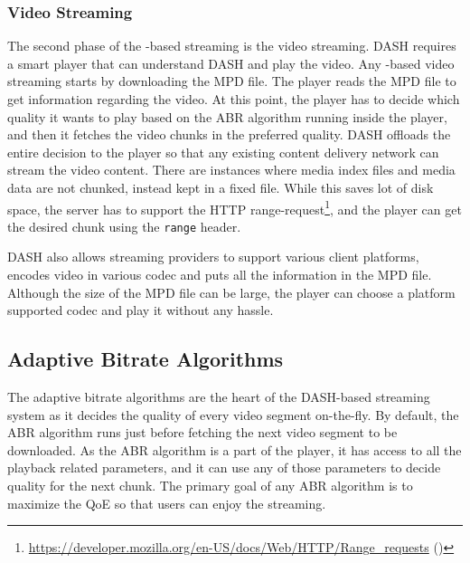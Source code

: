 \subsubsection{Video Streaming}
The second phase of the -based streaming is the video streaming. \ac{DASH} requires a smart player that can understand \ac{DASH} and play the video. Any -based video streaming starts by downloading the \ac{MPD} file. The player reads the \ac{MPD} file to get information regarding the video.  At this point, the player has to decide which quality it wants to play based on the \ac{ABR} algorithm running inside the player, and then it fetches the video chunks in the preferred quality. \ac{DASH} offloads the entire decision to the player so that any existing content delivery network can stream the video content. There are instances where media index files and media data are not chunked, instead kept in a fixed file. While this saves lot of disk space, the server has to support the HTTP range-request\footnote{\url{https://developer.mozilla.org/en-US/docs/Web/HTTP/Range_requests} (\lastaccessedtoday)}, and the player can get the desired chunk using the {\tt range} header.

\ac{DASH} also allows streaming providers to support various client platforms, encodes video in various codec and puts all the information in the \ac{MPD} file. Although the size of the \ac{MPD} file can be large, the player can choose a platform supported codec and play it without any hassle.


\subsection{Adaptive Bitrate Algorithms}
The adaptive bitrate algorithms are the heart of the DASH-based streaming system as it decides the quality of every video segment on-the-fly. By default, the \ac{ABR} algorithm runs just before fetching the next video segment to be downloaded. As the \ac{ABR} algorithm is a part of the player, it has access to all the playback related parameters, and it can use any of those parameters to decide quality for the next chunk. The primary goal of any \ac{ABR} algorithm is to maximize the \ac{QoE} so that users can enjoy the streaming.

